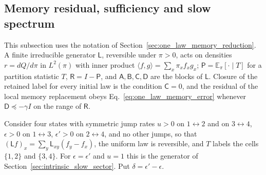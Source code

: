 \subsection{Memory residual, sufficiency and slow spectrum}\label{app:sp_memory_conditions}
This subsection uses the notation of Section~\ref{sec:one_law_memory_reduction}. A finite irreducible generator $\mathsf L$, reversible under $\pi>0$, acts on densities $r=dQ/d\pi$ in $L^2(\pi)$ with inner product $\langle f,g\rangle=\sum_x\pi_xf_xg_x$; $\mathsf P=\mathbb E_\pi[\cdot\mid T]$ for a partition statistic $T$, $\mathsf R=I-\mathsf P$, and $\mathsf A,\mathsf B,\mathsf C,\mathsf D$ are the blocks of $\mathsf L$. Closure of the retained label for every initial law is the condition $\mathsf C=0$, and the residual of the local memory replacement obeys Eq.~\eqref{eq:one_law_memory_error} whenever $\mathsf D\preceq-\gamma I$ on the range of $\mathsf R$.

Consider four states with symmetric jump rates $u>0$ on $1\leftrightarrow2$ and on $3\leftrightarrow4$, $\epsilon>0$ on $1\leftrightarrow3$, $\epsilon'>0$ on $2\leftrightarrow4$, and no other jumps, so that $(\mathsf Lf)_x=\sum_y\mathsf L_{xy}(f_y-f_x)$, the uniform law is reversible, and $T$ labels the cells $\{1,2\}$ and $\{3,4\}$. For $\epsilon=\epsilon'$ and $u=1$ this is the generator of Section~\ref{sec:intrinsic_slow_sector}. Put $\delta=\epsilon'-\epsilon$.

